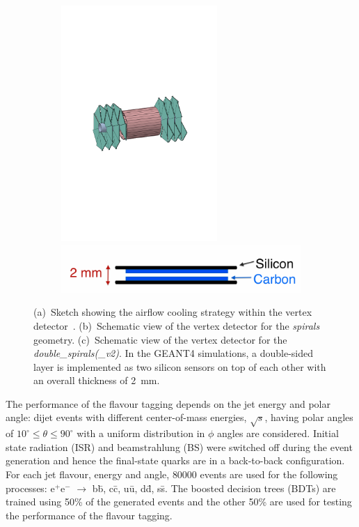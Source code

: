 \begin{figure}[htbp]
\begin{subfigure}[b]{0.25\textwidth}
    \includegraphics[trim = 32mm 98mm 85mm 106mm, clip, width=0.65\textwidth]{figures/CLIC/double_spiral.pdf} \\
    \includegraphics[width=1.5\textwidth]{figures/CLIC/double_layer_module.png} 
    \caption{}
    \label{fig:doubleLayer}
  \end{subfigure}
  \caption{(a)~Sketch showing the airflow cooling strategy within the
    vertex detector~\cite{DuarteRamos:1572989}. (b)~Schematic view of
    the vertex detector for the \emph{spirals} geometry. (c)~Schematic
    view of the vertex detector for the
    \emph{double\_spirals(\_v2)}. In the \textsc{GEANT4} simulations,
    a double-sided layer is implemented as two silicon sensors on top
    of each other with an overall thickness of \SI{2}{\milli\meter}.}
  \label{fig:geometries}
\end{figure}

The performance of the flavour tagging depends on the jet energy and
polar angle: dijet events with different center-of-mass energies,
$\sqrt{s}$, having polar angles of $10^{\circ} \leq \theta \leq
90^{\circ}$ with a uniform distribution in $\phi$ angles are
considered. Initial state radiation (ISR) and beamstrahlung (BS) were
switched off during the event generation and hence the final-state
quarks are in a back-to-back configuration. For each jet flavour,
energy and angle, 80000 events are used for the following processes:
e$^+$e$^-$ $\rightarrow$ b\={b}, c\={c}, u\={u}, d\={d}, s\={s}. The
boosted decision trees (BDTs) are trained using 50\% of the generated
events and the other 50\% are used for testing the performance of the
flavour tagging.

